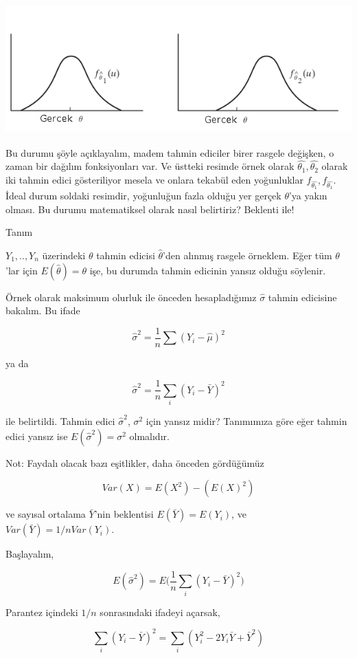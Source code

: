 \documentclass[12pt,fleqn]{article}\usepackage{../../common}
\begin{document}
\includegraphics[height=5cm]{unbias.png}

Bu durumu şöyle açıklayalım, madem tahmin ediciler birer rasgele değişken,
o zaman bir dağılım fonksiyonları var. Ve üstteki resimde örnek olarak
$\hat{\theta_1},\hat{\theta_2}$ olarak iki tahmin edici gösteriliyor mesela
ve onlara tekabül eden yoğunluklar $f_{\hat{\theta_1}},
f_{\hat{\theta_1}}$. İdeal durum soldaki resimdir, yoğunluğun fazla olduğu
yer gerçek $\theta$'ya yakın olması. Bu durumu matematiksel olarak nasıl
belirtiriz? Beklenti ile!

Tanım

$Y_1,..,Y_n$ üzerindeki $\theta$ tahmin edicisi $\hat{\theta}$'den alınmış
rasgele örneklem. Eğer tüm $\theta$'lar için $E(\hat{\theta}) = \theta$
işe, bu durumda tahmin edicinin yansız olduğu söylenir.

Örnek olarak maksimum olurluk ile önceden hesapladığımız $\hat{\sigma}$
tahmin edicisine bakalım. Bu ifade

$$ \hat{\sigma}^2 = \frac{1}{n}\sum (Y_i-\hat{\mu})^2 $$

ya da 

$$ \hat{\sigma}^2 = \frac{1}{n}\sum_i (Y_i-\bar{Y})^2 $$

ile belirtildi. Tahmin edici $\hat{\sigma}^2$, $\sigma^2$ için yansız midir?
Tanımımıza göre eğer tahmin edici yansız ise $E(\hat{\sigma}^2) = \sigma^2$
olmalıdır.

Not: Faydalı olacak bazı eşitlikler, daha önceden gördüğümüz

$$ Var(X) = E(X^2) - (E(X)^2)$$

ve sayısal ortalama $\bar{Y}$'nin beklentisi $E({\bar{Y}}) = E(Y_i)$, ve
$Var(\bar{Y}) = 1/n Var(Y_i)$.

Başlayalım,

$$ E(\hat{\sigma}^2) = E\bigg(\frac{1}{n}\sum_i (Y_i-\bar{Y})^2 \bigg)$$

Parantez içindeki $1/n$ sonrasındaki ifadeyi açarsak,


$$ \sum_i (Y_i-\bar{Y})^2  =  \sum_i (Y_i^2-2Y_i\bar{Y}+ \bar{Y}^2)$$
\end{document}
